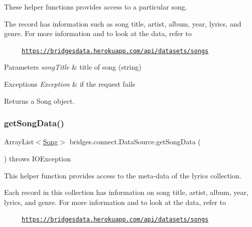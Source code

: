 These helper functions provides access to a particular song.

The record has information such as song title, artist, album, year, lyrics, and genre. For more information and to look at the data, refer to 

~~~~~\href{https://bridgesdata.herokuapp.com/api/datasets/songs}{\tt https\+://bridgesdata.\+herokuapp.\+com/api/datasets/songs} 


\begin{DoxyParams}{Parameters}
{\em song\+Title} & title of song (string) \\
\hline
\end{DoxyParams}

\begin{DoxyExceptions}{Exceptions}
{\em Exception} & if the request fails\\
\hline
\end{DoxyExceptions}
\begin{DoxyReturn}{Returns}
a Song object. 
\end{DoxyReturn}
\mbox{\label{classbridges_1_1connect_1_1_data_source_aeccb689aeacc094b0621ab5564849fa6}} 
\subsubsection{\texorpdfstring{get\+Song\+Data()}{getSongData()}}
{\footnotesize\ttfamily Array\+List$<$\hyperlink{classbridges_1_1data__src__dependent_1_1_song}{Song}$>$ bridges.\+connect.\+Data\+Source.\+get\+Song\+Data (\begin{DoxyParamCaption}{ }\end{DoxyParamCaption}) throws I\+O\+Exception}

This helper function provides access to the meta-\/data of the lyrics collection.

Each record in this collection has information on song title, artist, album, year, lyrics, and genre. For more information and to look at the data, refer to 

~~~~~\href{https://bridgesdata.herokuapp.com/api/datasets/songs}{\tt https\+://bridgesdata.\+herokuapp.\+com/api/datasets/songs} 


